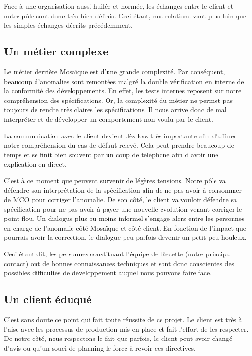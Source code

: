 Face à une organisation aussi huilée et normée, les échanges entre le client et notre pôle sont donc très bien définis. Ceci étant, nos relations vont plus loin que les simples échanges décrits précédemment.

\subsection{Un métier complexe}

    Le métier derrière Mosaïque est d'une grande complexité. Par conséquent, beaucoup d'anomalies sont remontées malgré la double vérification en interne de la conformité des développements. En effet, les tests internes reposent sur notre compréhension des spécifications. Or, la complexité du métier ne permet pas toujours de rendre très claires les spécifications. Il nous arrive donc de mal interpréter et de développer un comportement non voulu par le client.
    
    La communication avec le client devient dès lors très importante afin d'affiner notre compréhension du cas de défaut relevé. Cela peut prendre beaucoup de temps et se finit bien souvent par un coup de téléphone afin d'avoir une explication en direct. 
    
    C'est à ce moment que peuvent survenir de légères tensions. Notre pôle va défendre son interprétation de la spécification afin de ne pas avoir à consommer de MCO pour corriger l'anomalie. De son côté, le client va vouloir défendre sa spécification pour ne pas avoir à payer une nouvelle évolution venant corriger le point flou. Un dialogue plus ou moins informel s'engage alors entre les personnes en charge de l'anomalie côté Mosaïque et côté client. En fonction de l'impact que pourrais avoir la correction, le dialogue peu parfois devenir un petit peu houleux.
    
    Ceci étant dit, les personnes constituant l'équipe de Recette (notre principal contact) ont de bonnes connaissances techniques et sont donc conscientes des possibles difficultés de développement auquel nous pouvons faire face.
    
\clearpage
\subsection{Un client éduqué}

    C'est sans doute ce point qui fait toute réussite de ce projet. Le client est très à l'aise avec les processus de production mis en place et fait l'effort de les respecter. De notre côté, nous respectons le fait que parfois, le client peut avoir changé d'avis ou qu'un souci de planning le force à revoir ces directives.
    
